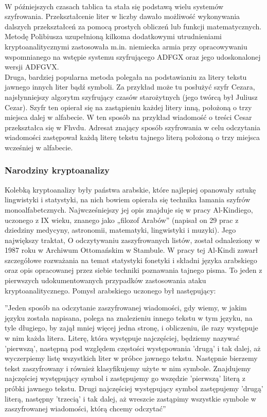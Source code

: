 \documentclass[10pt, a4paper, titlepage]{article}
\begin{document}
\\
W późniejszych czasach tablica ta stała się podstawą wielu systemów szyfrowania. Przekształcenie liter w liczby dawało możliwość wykonywania dalszych przekształceń za pomocą prostych obliczeń lub funkcji matematycznych. Metodę Polibiusza uzupełnioną kilkoma dodatkowymi utrudnieniami kryptoanalitycznymi zastosowała m.in. niemiecka armia przy opracowywaniu wspomnianego na wstępie systemu szyfrującego ADFGX oraz jego udoskonalonej wersji ADFGVX.\\ 
Druga, bardziej popularna metoda polegała na podstawianiu za litery tekstu jawnego innych liter bądź symboli. Za przykład może tu posłużyć szyfr Cezara, najsłynniejszy algorytm szyfrujący czasów starożytnych (jego twórcą był Juliusz Cezar). Szyfr ten opierał się na zastąpieniu każdej litery inną, położoną o trzy miejsca dalej w alfabecie. W ten sposób na przykład wiadomość o treści Cesar przekształca się w Fhvdu. Adresat znający sposób szyfrowania w celu odczytania wiadomości zastępował każdą literę tekstu tajnego literą położoną o trzy miejsca wcześniej w alfabecie.

\subsubsection{Narodziny kryptoanalizy}
Kolebką kryptoanalizy były państwa arabskie, które najlepiej opanowały sztukę lingwistyki i statystyki, na nich bowiem opierała się technika łamania szyfrów monoalfabetcznych. Najwcześniejszy jej opis znajduje się w pracy Al-Kindiego, uczonego z IX wieku, znanego jako „filozof Arabów” (napisał on 29 prac z dziedziny medycyny, astronomii, matematyki, lingwistyki i muzyki). Jego największy traktat, O odczytywaniu zaszyfrowanych listów, został odnaleziony w 1987 roku w Archiwum Ottomańskim w Stambule. W pracy tej Al-Kindi zawarł szczegółowe rozważania na temat statystyki fonetyki i składni języka arabskiego oraz opis opracowanej przez siebie techniki poznawania tajnego pisma. To jeden z pierwszych udokumentowanych przypadków zastosowania ataku kryptoanalitycznego. Pomysł arabskiego uczonego był następujący:\\
\begin{center}
”Jeden sposób na odczytanie zaszyfrowanej wiadomości, gdy wiemy, w jakim języku została napisana, polega na znalezieniu innego tekstu w tym języku, na tyle długiego, by zajął mniej więcej jedna stronę, i obliczeniu, ile razy występuje w nim każda litera. Literę, która występuje najczęściej, będziemy nazywać ’pierwszą’, następną pod względem częstości występowania ’drugą’ i tak dalej, aż wyczerpiemy listę wszystkich liter w próbce jawnego tekstu. Następnie bierzemy tekst zaszyfrowany i również klasyfikujemy użyte w nim symbole. Znajdujemy najczęściej występujący symbol i zastępujemy go wszędzie ’pierwszą’ literą z próbki jawnego tekstu. Drugi najczęściej występujący symbol zastępujemy ’drugą’ literą, następny ’trzecią’ i tak dalej, aż wreszcie zastąpimy wszystkie symbole w zaszyfrowanej wiadomości, którą chcemy odczytać”\cite{[2]}
\end{center}
\end{document}
